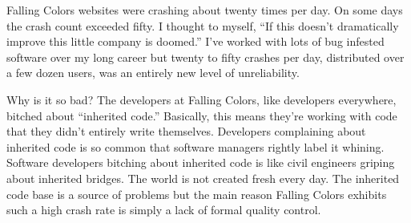 %

Falling Colors websites were crashing about twenty times per day. On
some days the crash count exceeded fifty. I thought to myself, ``If this
doesn't dramatically improve this little company is doomed.'' I've
worked with lots of bug infested software over my long career but twenty
to fifty crashes per day, distributed over a few dozen users, was an
entirely new level of unreliability.

Why is it so bad? The developers at Falling Colors, like developers
everywhere, bitched about ``inherited code.'' Basically, this means
they're working with code that they didn't entirely write themselves.
Developers complaining about inherited code is so common that software
managers rightly label it whining. Software developers bitching about
inherited code is like civil engineers griping about inherited bridges.
The world is not created fresh every day. The inherited code base is a
source of problems but the main reason Falling Colors exhibits such a
high crash rate is simply a lack of formal quality control.

